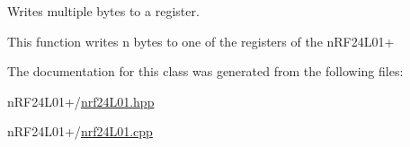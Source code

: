Writes multiple bytes to a register. 

This function writes n bytes to one of the registers of the n\+R\+F24\+L01+ 

The documentation for this class was generated from the following files\+:\begin{DoxyCompactItemize}
\item 
n\+R\+F24\+L01+/\hyperlink{nrf24L01_8hpp}{nrf24\+L01.\+hpp}\item 
n\+R\+F24\+L01+/\hyperlink{nrf24L01_8cpp}{nrf24\+L01.\+cpp}\end{DoxyCompactItemize}
